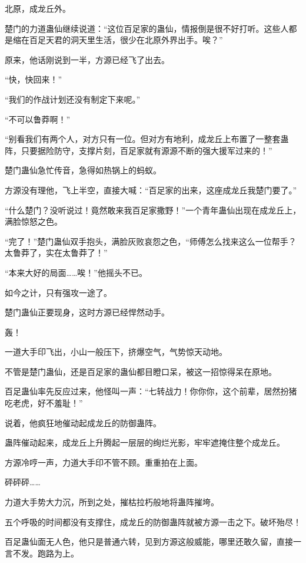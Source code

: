 
\begin{this_body}

北原，成龙丘外。

楚门的力道蛊仙继续说道：“这位百足家的蛊仙，情报倒是很不好打听。这些人都是缩在百足天君的洞天里生活，很少在北原外界出手。唉？”

原来，他话刚说到一半，方源已经飞了出去。

“快，快回来！”

“我们的作战计划还没有制定下来呢。”

“不可以鲁莽啊！”

“别看我们有两个人，对方只有一位。但对方有地利，成龙丘上布置了一整套蛊阵，只要据险防守，支撑片刻，百足家就有源源不断的强大援军过来的！”

楚门蛊仙急忙传音，急得如热锅上的蚂蚁。

方源没有理他，飞上半空，直接大喊：“百足家的出来，这座成龙丘我楚门要了。”

“什么楚门？没听说过！竟然敢来我百足家撒野！”一个青年蛊仙出现在成龙丘上，满脸惊怒之色。

“完了！”楚门蛊仙双手抱头，满脸灰败哀怨之色，“师傅怎么找来这么一位帮手？太鲁莽了，实在太鲁莽了！”

“本来大好的局面……唉！”他摇头不已。

如今之计，只有强攻一途了。

楚门蛊仙正要现身，这时方源已经悍然动手。

轰！

一道大手印飞出，小山一般压下，挤爆空气，气势惊天动地。

不管是楚门蛊仙，还是百足家的蛊仙都目瞪口呆，被这一招惊得呆在原地。

百足蛊仙率先反应过来，他怪叫一声：“七转战力！你你你，这个前辈，居然扮猪吃老虎，好不羞耻！”

说着，他疯狂地催动起成龙丘的防御蛊阵。

蛊阵催动起来，成龙丘上升腾起一层层的绚烂光影，牢牢遮掩住整个成龙丘。

方源冷哼一声，力道大手印不管不顾。重重拍在上面。

砰砰砰……

力道大手势大力沉，所到之处，摧枯拉朽般地将蛊阵摧垮。

五个呼吸的时间都没有支撑住，成龙丘的防御蛊阵就被方源一击之下。破坏殆尽！

百足蛊仙面无人色，他只是普通六转，见到方源这般威能，哪里还敢久留，直接一言不发。跑路为上。


\end{this_body}
